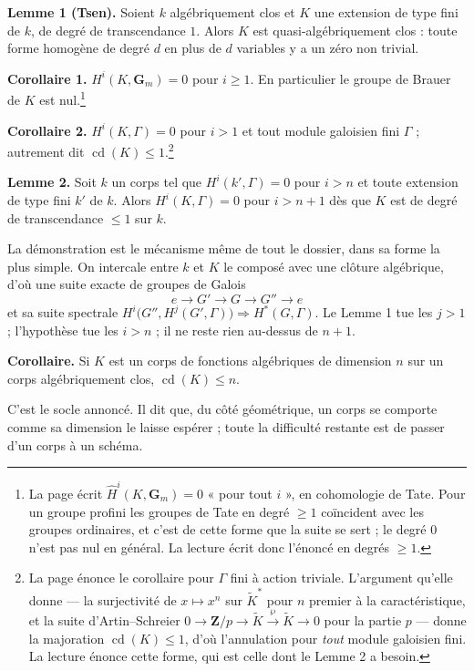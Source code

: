 \documentclass[11pt,a4paper]{article}
\begin{document}
\textbf{Lemme 1 (Tsen).} Soient $k$ algébriquement clos et $K$ une extension de
type fini de $k$, de degré de transcendance $1$. Alors $K$ est
quasi-algébriquement clos : toute forme homogène de degré $d$ en plus de $d$
variables y a un zéro non trivial.

\textbf{Corollaire 1.} $H^i(K, \mathbf{G}_m) = 0$ pour $i \geqslant 1$. En
particulier le groupe de Brauer de $K$ est nul.\footnote{La page écrit
$\widehat{H}^i(K, \mathbf{G}_m) = 0$ « pour tout $i$ », en cohomologie de Tate.
Pour un groupe profini les groupes de Tate en degré $\geqslant 1$ coïncident
avec les groupes ordinaires, et c'est de cette forme que la suite se sert ; le
degré $0$ n'est pas nul en général. La lecture écrit donc l'énoncé en degrés
$\geqslant 1$.}

\textbf{Corollaire 2.} $H^i(K, \Gamma) = 0$ pour $i > 1$ et tout module
galoisien fini $\Gamma$ ; autrement dit
$\operatorname{cd}(K) \leqslant 1$.\footnote{La page énonce le corollaire pour
$\Gamma$ fini à action triviale. L'argument qu'elle donne — la surjectivité de
$x \mapsto x^n$ sur $\widetilde{K}^{*}$ pour $n$ premier à la caractéristique,
et la suite d'Artin--Schreier
$0 \to \mathbf{Z}/p \to \widetilde{K} \xrightarrow{\wp} \widetilde{K} \to 0$
pour la partie $p$ — donne la majoration $\operatorname{cd}(K) \leqslant 1$,
d'où l'annulation pour \emph{tout} module galoisien fini. La lecture énonce
cette forme, qui est celle dont le Lemme 2 a besoin.}

\textbf{Lemme 2.} Soit $k$ un corps tel que $H^i(k', \Gamma) = 0$ pour $i > n$
et toute extension de type fini $k'$ de $k$. Alors $H^i(K, \Gamma) = 0$ pour
$i > n+1$ dès que $K$ est de degré de transcendance $\leqslant 1$ sur $k$.

La démonstration est le mécanisme même de tout le dossier, dans sa forme la plus
simple. On intercale entre $k$ et $K$ le composé avec une clôture algébrique,
d'où une suite exacte de groupes de Galois
\[
e \longrightarrow G' \longrightarrow G \longrightarrow G'' \longrightarrow e
\]
et sa suite spectrale
$H^i\bigl(G'', H^j(G', \Gamma)\bigr) \Rightarrow H^{*}(G, \Gamma)$. Le Lemme 1
tue les $j > 1$ ; l'hypothèse tue les $i > n$ ; il ne reste rien au-dessus de
$n+1$.

\textbf{Corollaire.} Si $K$ est un corps de fonctions algébriques de dimension
$n$ sur un corps algébriquement clos, $\operatorname{cd}(K) \leqslant n$.

C'est le socle annoncé. Il dit que, du côté géométrique, un corps se comporte
comme sa dimension le laisse espérer ; toute la difficulté restante est de
passer d'un corps à un schéma.
\end{document}
